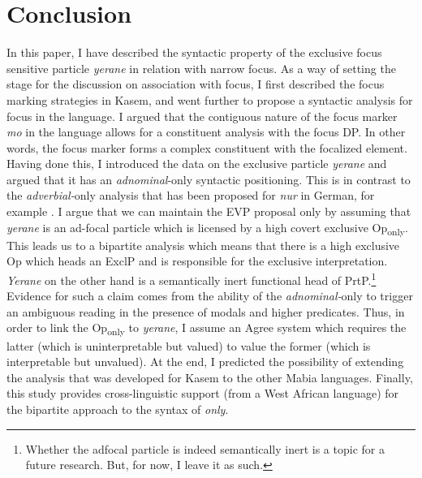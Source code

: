 \documentclass[output=paper,colorlinks,citecolor=brown,draftmode
]{langscibook}
\begin{document}
\section{Conclusion} \label{sec:Aremu:Conclusions}
In this paper, I have described the syntactic property of the exclusive focus sensitive particle \textit{yerane} in relation with narrow focus. As a way of setting the stage for the discussion on association with focus, I first described the focus marking strategies in Kasem, and went further to propose a syntactic analysis for focus in the language. I argued that the contiguous nature of the focus marker \textit{mo} in the language allows for a constituent analysis with the focus DP. In other words, the focus marker forms a complex constituent with the focalized element. Having done this, I introduced the data on the exclusive particle \textit{yerane} and argued that it has an \textit{adnominal}-only syntactic positioning. This is in contrast to the \textit{adverbial-}only analysis that has been proposed for \textit{nur} in German, for example \citep{jacobs1983fokus, buring2001syntax, Mursell2021ISagreement}. I argue that we can maintain the EVP proposal only by assuming that \textit{yerane} is an ad-focal particle which is licensed by a high covert exclusive Op\textsubscript{only}. This leads us to a bipartite analysis which means that there is a high exclusive Op which heads an ExclP and is responsible for the exclusive interpretation. \textit{Yerane} on the other hand is a semantically inert functional head of PrtP.\footnote{Whether the adfocal particle is indeed semantically inert is a topic for a future research. But, for now, I leave it as such.} Evidence for such a claim comes from the ability of the \textit{adnominal-}only to trigger an ambiguous reading in the presence of modals and higher predicates. Thus, in order to link the Op\textsubscript{only} to \textit{yerane}, I assume an Agree system which requires the latter (which is uninterpretable but valued) to value the former (which is interpretable but unvalued). At the end, I predicted the possibility of extending the analysis that was developed for Kasem to the other Mabia languages. Finally, this study provides cross-linguistic support (from a West African language) for the bipartite approach to the syntax of \textit{only}. %
\end{document}
